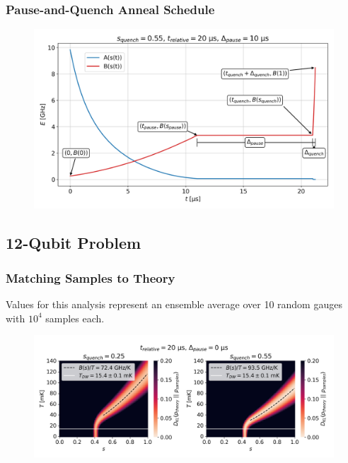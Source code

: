 \documentclass{beamer}
\begin{document}
\begin{frame}
    \frametitle{Pause-and-Quench Anneal Schedule}
    \begin{figure}
        \includegraphics[width=1\linewidth]{qbm/anneal_schedules/Advantage_system4.1-s_pause=0.55-pause_duration=10.png}
    \end{figure}
\end{frame}

\subsection{12-Qubit Problem}
\begin{frame}
    \frametitle{Matching Samples to Theory}
    Values for this analysis represent an ensemble average over 10 random gauges with \( 10^4 \) samples each.
    \begin{figure}
        \includegraphics[width=1\linewidth]{qbm/8x4/embedding_comparison/config_05/dkl_min_heatmap-embedding=10.png}
    \end{figure}
\end{frame}
\end{document}
